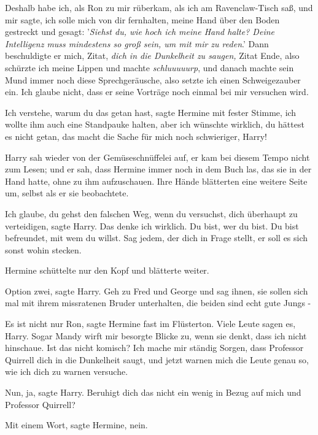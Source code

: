 \glqq{}Deshalb habe ich, als Ron zu mir rüberkam, als ich am Ravenclaw-Tisch saß,
und mir sagte, ich solle mich von dir fernhalten, meine Hand über den Boden
gestreckt und gesagt: '\emph{Siehst du, wie hoch ich meine Hand halte? Deine
Intelligenz muss mindestens so groß sein, um mit mir zu reden}.' Dann
beschuldigte er mich, Zitat, \emph{dich in die Dunkelheit zu saugen,} Zitat
Ende, also schürzte ich meine Lippen und machte \emph{schluuuuurp}, und danach
machte sein Mund immer noch diese Sprechgeräusche, also setzte ich einen
Schweigezauber ein. Ich glaube nicht, dass er seine Vorträge noch einmal bei mir
versuchen wird.\grqq{}

\glqq{}Ich verstehe, warum du das getan hast\grqq{}, sagte Hermine mit fester
Stimme, \glqq{}ich wollte ihm auch eine Standpauke halten, aber ich wünschte
wirklich, du hättest es nicht getan, das macht die Sache für mich noch
schwieriger, Harry!\grqq{}

Harry sah wieder von der Gemüseschnüffelei auf, er kam bei diesem Tempo nicht
zum Lesen; und er sah, dass Hermine immer noch in dem Buch las, das sie in der
Hand hatte, ohne zu ihm aufzuschauen. Ihre Hände blätterten eine weitere Seite
um, selbst als er sie beobachtete.

\glqq{}Ich glaube, du gehst den falschen Weg, wenn du versuchst, dich überhaupt
zu verteidigen\grqq{}, sagte Harry. \glqq{}Das denke ich wirklich. Du bist, wer
du bist. Du bist befreundet, mit wem du willst. Sag jedem, der dich in Frage
stellt, er soll es sich sonst wohin stecken.\grqq{}

Hermine schüttelte nur den Kopf und blätterte weiter.

\glqq{}Option zwei\grqq{}, sagte Harry. \glqq{}Geh zu Fred und George und sag
ihnen, sie sollen sich mal mit ihrem missratenen Bruder unterhalten, die beiden
sind echt gute Jungs -\grqq{}

\glqq{}Es ist nicht nur Ron\grqq{}, sagte Hermine fast im Flüsterton. \glqq{}Viele
Leute sagen es, Harry. Sogar Mandy wirft mir besorgte Blicke zu, wenn sie denkt,
dass ich nicht hinschaue. Ist das nicht komisch? Ich mache mir ständig Sorgen,
dass Professor Quirrell dich in die Dunkelheit saugt, und jetzt warnen mich die
Leute genau so, wie ich dich zu warnen versuche.\grqq{}

\glqq{}Nun, ja\grqq{}, sagte Harry. \glqq{}Beruhigt dich das nicht ein wenig in
Bezug auf mich und Professor Quirrell?\grqq{}

\glqq{}Mit einem Wort\grqq{}, sagte Hermine, \glqq{}nein.\grqq{}

